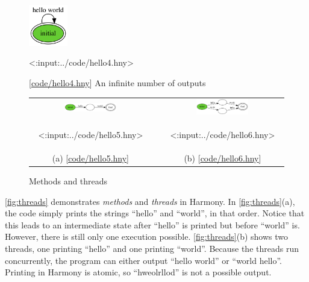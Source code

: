 \documentclass{report}
\newcommand{\harmonylink}[1]{%
[\href{https://harmony.cs.cornell.edu/#1}{\underline{#1}}]%
}
\newenvironment{code}{
\tcolorbox
}{
\endtcolorbox
}
\begin{document}
\begin{figure}
\begin{center}
\includegraphics[width=0.15\textwidth]{figures/hello4.png}
\end{center}
\begin{code}
<{:input:../code/hello4.hny}>
\end{code}
\caption{\harmonylink{code/hello4.hny} An infinite number of outputs}
\label{fig:hello4}
\end{figure}

\begin{figure}[h]
\begin{center}
\begin{tabular}{ccc}
\includegraphics[width=0.45\textwidth]{figures/hello5.png}
& \rule{0.05\linewidth}{0in} &
\includegraphics[width=0.45\textwidth]{figures/hello6.png} \\
\begin{tcolorbox}[width=0.4\linewidth]
<{:input:../code/hello5.hny}>
\end{tcolorbox}
& \rule{0.05\linewidth}{0in} &
\begin{tcolorbox}[width=0.4\linewidth]
<{:input:../code/hello6.hny}>
\end{tcolorbox}
\\
(a) \harmonylink{code/hello5.hny} && (b) \harmonylink{code/hello6.hny}
\end{tabular}
\end{center}
\caption{Methods and threads}
\label{fig:threads}
\end{figure}

\autoref{fig:threads} demonstrates \emph{methods} and \emph{threads} in Harmony.
In \autoref{fig:threads}(a), the code simply prints the
strings ``hello'' and ``world'', in that order.
Notice that this leads to an intermediate
state after ``hello'' is printed but before ``world'' is.  However, there
is still only one execution possible. \autoref{fig:threads}(b) shows two
threads, one printing ``hello'' and one printing ``world''.  Because the
threads run concurrently, the program can either output ``hello world'' or
``world hello''.  Printing in Harmony is atomic, so ``hweolrllod'' is not
a possible  output.
\end{document}
